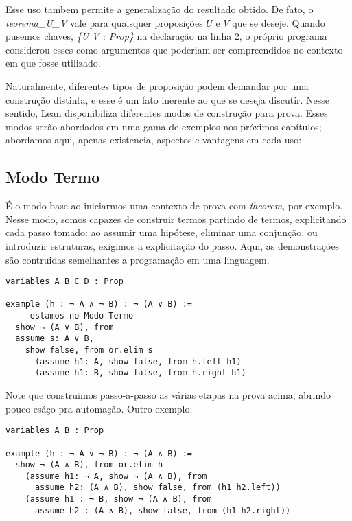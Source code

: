 \noindent Esse uso tambem permite a generalização do resultado obtido. De fato, o \textit{teorema\_U\_V} vale para quaisquer proposições $U$ e $V$ que se deseje. Quando pusemos chaves, \textit{\{U V : Prop\}} na declaração na linha 2, o próprio programa considerou esses como argumentos que poderiam ser compreendidos no contexto em que fosse utilizado.

\vspace{5mm}

Naturalmente, diferentes tipos de proposição podem demandar por uma construção distinta, e esse é um fato inerente ao que se deseja discutir. Nesse sentido, Lean disponibiliza diferentes modos de construção para prova. Esses modos serão abordados em uma gama de exemplos nos próximos capítulos; abordamos aqui, apenas existencia, aspectos e vantagens em cada uso:

\subsection{Modo Termo}
É o modo base ao iniciarmos uma contexto de prova com \textit{theorem}, por exemplo. Nesse modo, somos capazes de construir termos partindo de termos, explicitando cada passo tomado: ao assumir uma hipótese, eliminar uma conjunção, ou introduzir estruturas, exigimos a explicitação do passo. Aqui, as demonstrações são contruidas semelhantes a programação em uma linguagem.

\vspace{5mm}
\begin{lstlisting}
variables A B C D : Prop

example (h : ¬ A ∧ ¬ B) : ¬ (A ∨ B) :=
  -- estamos no Modo Termo
  show ¬ (A ∨ B), from
  assume s: A ∨ B,
    show false, from or.elim s
      (assume h1: A, show false, from h.left h1)
      (assume h1: B, show false, from h.right h1)
\end{lstlisting}
\vspace{5mm}

\noindent Note que construimos passo-a-passo as várias etapas na prova acima, abrindo pouco esáço pra automação. Outro exemplo:

\vspace{5mm}
\begin{lstlisting}
variables A B : Prop

example (h : ¬ A ∨ ¬ B) : ¬ (A ∧ B) :=
  show ¬ (A ∧ B), from or.elim h
    (assume h1: ¬ A, show ¬ (A ∧ B), from
      assume h2: (A ∧ B), show false, from (h1 h2.left))
    (assume h1 : ¬ B, show ¬ (A ∧ B), from
      assume h2 : (A ∧ B), show false, from (h1 h2.right))
\end{lstlisting}
\vspace{5mm}

